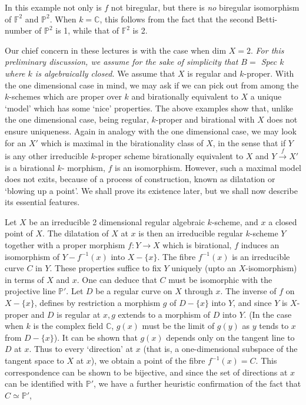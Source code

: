  In this example not only is $f$ not biregular, but there is
 \textit{no} biregular isomorphism of $\mathbb{F}^2$ and
 $\mathbb{P}^2$. When $k = \mathbb{C}$, this follows from
 the fact that the second Betti-number of $\mathbb{P}^2$ is 1, while
 that of $\mathbb{F}^2$ is 2.  
 
 Our chief concern in these lectures is with the case when dim
 $X=2$. \textit{For this preliminary discussion, we assume for the
   sake of simplicity that $B =$ Spec $k$ where $k$ is algebraically
   closed.} We assume that $X$ is regular and $k$-proper. With the one
 dimensional case in mind, we may ask if we can pick out from among
 the $k$-schemes which are proper over $k$ and birationally equivalent
 to $X$ a unique `model' which has some `nice' properties. The above
 examples show that, unlike the one dimensional case, being regular,
 $k$-proper and birational with $X$ does not ensure uniqueness. Again in
 analogy with the one dimensional case, we may look for an $X'$ which
 is maximal in the birationality class of $X$, in the sense that if
 $Y$ is any other irreducible $k$-proper scheme birationally equivalent
 to $X$ and $ Y \overset{f}{\rightarrow} X'$ is a birational $k$-
 morphism, $f$ is an isomorphism. However, such a maximal model does
 not exits, because of a process of construction, known as dilatation
 or `blowing up a point'. We shall prove its existence later, but we
 shall now describe its essential features.\pageoriginale 
 
 Let $X$ be an irreducible 2 dimensional regular algebraic
 $k$-scheme, and $x$ a closed point of $X$. The dilatation of $X$ at
 $x$ is then an irreducible regular $k$-scheme $Y$ together with a
 proper morphism $f:Y \rightarrow X $ which is birational, $f$ induces
 an isomorphism of $Y-f^{-1}(x)$ into $X - \{ x \}$. The fibre
 $f^{-1}(x)$ is an irreducible curve $C$ in $Y$. These properties
 suffice to fix $Y$ uniquely (upto an $X$-isomorphism) in terms of $X$
 and $x$. One can deduce that $C$ must be isomorphic with the
 projective line $\mathbb{P}'$. Let $D$ be a  regular curve on  $X$
 through $x$. The inverse of $f$ on $X -\{x\}$, defines by restriction
 a morphism $g$  of $D-\{ x \}$ into  $Y$, and since $Y$ is $X$-proper
 and $D$ is  regular at $x, g$ extends to a morphism of $D$ into
 $Y$. (In the case when $k$ is the complex field $\mathbb{C}$, $g(x)$
 must be the limit of $g(y)$ as $y$ tends to $x$ from $D - \{x\}$). It
 can be shown that $g(x)$ depends only on the tangent line to $D$ at
 $x$. Thus to every `direction' at $x$ (that is, a one-dimensional
 subspace of the tangent space to $X$ at $x$), we obtain a point of
 the fibre $f^{-1}(x) = C$. This correspondence can be shown to be
 bijective, and since the set of directions at $x$ can be identified
 with $\mathbb{P}'$, we have a further heuristic confirmation of
 the fact that $C \simeq \mathbb{P}'$,  
  
